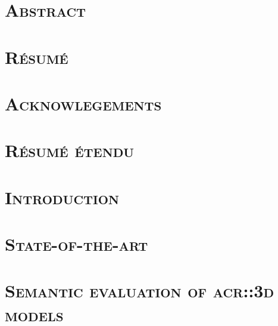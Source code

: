 \documentclass[12pt, twoside]{book}
\begin{document}
    \dominitoc
    \doparttoc
    \frontmatter
    \pagestyle{plain}
   
    
    
    \chapter{\textsc{Abstract}}
        
    \chapter{\textsc{Résumé}}
        

    \chapter{\textsc{Acknowlegements}}
        

    \tableofcontents
    \mtcaddchapter
    \listoffigures
    \mtcaddchapter
    \listoftables
    \mtcaddchapter

    \printglossary[type=\acronymtype]
    \printglossary

    \mainmatter

    \chapter*{\textsc{Résumé étendu}}
        \adjustmtc[2]
        

    \chapter{\textsc{Introduction}}
        \label{chap::introduction}
        
    
    \chapter{\textsc{State-of-the-art}}
        \label{chap::state_of_the_art}
        

    \chapter{\textsc{Semantic evaluation of \texorpdfstring{\gls*{acr::3d}}{3D} models}}
        \label{chap::semantic_evaluation}
        
\end{document}
